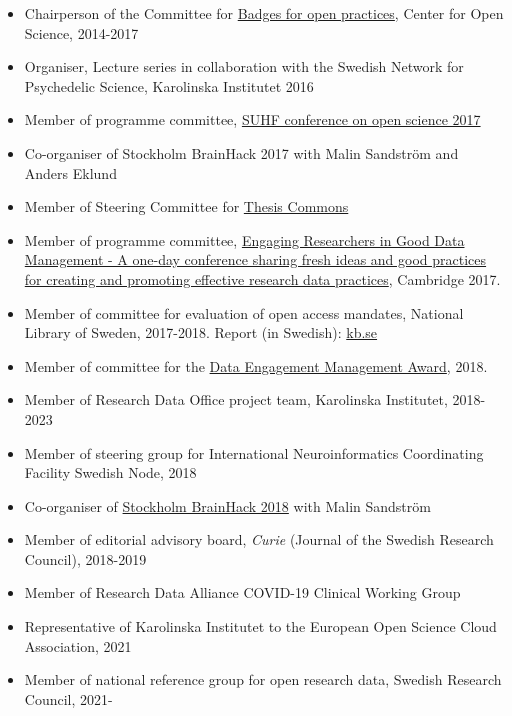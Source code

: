 \documentclass[10pt]{article}
\begin{document}
\begin{itemize}[nolistsep]
\item Chairperson of the Committee for \href{https://osf.io/tvyxz/wiki/home/}{Badges for open practices}, Center for Open Science, 2014-2017
\item Organiser, Lecture series in collaboration with the Swedish Network for Psychedelic Science, Karolinska Institutet 2016
\item Member of programme committee, \href{http://www.suhf.se/publicerat/konferensdokumentation?MA_START_FOLDER=f5322123-a0c6-4fec-9f77-d1c222b8a51b}{SUHF conference on open science 2017}
\item Co-organiser of Stockholm BrainHack 2017 with Malin Sandström and Anders Eklund
\item Member of Steering Committee for \href{https://thesiscommons.org/}{Thesis Commons}
\item Member of programme committee, \href{https://www.data.cam.ac.uk/datanews/engaging-researchers-good-data-management-2017-conference}{Engaging Researchers in Good Data Management - A one-day conference sharing fresh ideas and good practices for creating and promoting effective research data practices}, Cambridge 2017. 
\item Member of committee for evaluation of open access mandates, National Library of Sweden, 2017-2018. Report (in Swedish): 
\href{https://www.kb.se/om-oss/nyheter/nyhetsarkiv/2019-03-19-16-rekommen-dationer-for-oppen-tillgang.html}{kb.se}
\item Member of committee for the \href{http://www.rdmengagementaward.org/}{Data Engagement Management Award}, 2018. 
\item Member of Research Data Office project team, Karolinska Institutet, 2018-2023
\item Member of steering group for International Neuroinformatics Coordinating Facility Swedish Node, 2018
\item Co-organiser of \href{https://www.incf.org/activities/incf-events/incf-brainhack-2018}{Stockholm BrainHack 2018} with Malin Sandström
\item Member of editorial advisory board, \emph{Curie} (Journal of the Swedish Research Council), 2018-2019
\item Member of Research Data Alliance COVID-19 Clinical Working Group 
\item Representative of Karolinska Institutet to the European Open Science Cloud Association, 2021
\item Member of national reference group for open research data, Swedish Research Council, 2021-

\end{itemize}
\end{document}
